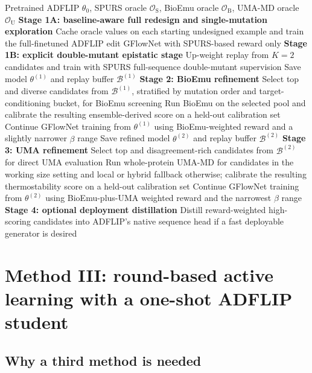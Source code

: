 \documentclass[11pt]{article}
\newcommand{\methodII}{\textsc{Seq-Curr}}
\begin{document}
	\begin{algorithm}[H]
		\caption{\methodII{}: sequential curriculum from SPURS exploration to BioEmu and UMA refinement}
		\label{alg:method2}
		\begin{algorithmic}[1]
			\Require Pretrained ADFLIP $\theta_0$, SPURS oracle $\mathcal{O}_{\mathrm S}$, BioEmu oracle $\mathcal{O}_{\mathrm B}$, UMA-MD oracle $\mathcal{O}_{\mathrm U}$
			\Statex \textbf{Stage 1A: baseline-aware full redesign and single-mutation exploration}
			\State Cache oracle values on each starting undesigned example and train the full-finetuned ADFLIP edit GFlowNet with SPURS-based reward only
			\Statex \textbf{Stage 1B: explicit double-mutant epistatic stage}
			\State Up-weight replay from $K=2$ candidates and train with SPURS full-sequence double-mutant supervision
			\State Save model $\theta^{(1)}$ and replay buffer $\mathcal{B}^{(1)}$
			\Statex \textbf{Stage 2: BioEmu refinement}
			\State Select top and diverse candidates from $\mathcal{B}^{(1)}$, stratified by mutation order and target-conditioning bucket, for BioEmu screening
			\State Run BioEmu on the selected pool and calibrate the resulting ensemble-derived score on a held-out calibration set
			\State Continue GFlowNet training from $\theta^{(1)}$ using BioEmu-weighted reward and a slightly narrower $\beta$ range
			\State Save refined model $\theta^{(2)}$ and replay buffer $\mathcal{B}^{(2)}$
			\Statex \textbf{Stage 3: UMA refinement}
			\State Select top and disagreement-rich candidates from $\mathcal{B}^{(2)}$ for direct UMA evaluation
			\State Run whole-protein UMA-MD for candidates in the working size setting and local or hybrid fallback otherwise; calibrate the resulting thermostability score on a held-out calibration set
			\State Continue GFlowNet training from $\theta^{(2)}$ using BioEmu-plus-UMA weighted reward and the narrowest $\beta$ range
			\Statex \textbf{Stage 4: optional deployment distillation}
			\State Distill reward-weighted high-scoring candidates into ADFLIP's native sequence head if a fast deployable generator is desired
		\end{algorithmic}
	\end{algorithm}
	
	
	\section{Method III: round-based active learning with a one-shot ADFLIP student}
	\label{sec:method3}
	
	\subsection{Why a third method is needed}
	
\end{document}
